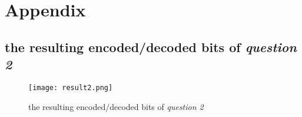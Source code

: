 \documentclass{article}
\begin{document}
\begin{CJK*}{UTF8}{bsmi}
\begin{enumerate}
\end{enumerate}


\section{Appendix}
\subsection{the resulting encoded/decoded bits of \emph{question 2}}
\begin{figure}[h]
\centering
\texttt{[image: result2.png]}
\caption{\label{fig:result2.png}the resulting encoded/decoded bits of \emph{question 2}}
\end{figure}

\end{CJK*}
\end{document}
